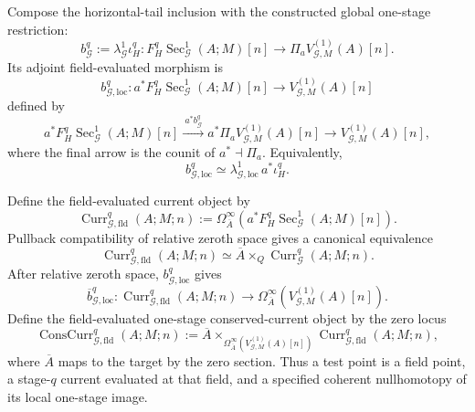 \begin{construction}
\label{constr:symmetry-noether-universal-one-stage-conserved-current-object}
Compose the horizontal-tail inclusion with the constructed global one-stage
restriction:
\[
b_{\mathcal G}^{q}
:=
\lambda_{\mathcal G}^{1}\iota_H^q:
F_H^q\operatorname{Sec}_{\mathcal G}^{1}(A;M)[n]
\longrightarrow
\Pi_aV_{\mathcal G,M}^{(1)}(A)[n].
\]
Its adjoint field-evaluated morphism is
\[
\boxed{
b_{\mathcal G,\mathrm{loc}}^{q}:
a^*F_H^q\operatorname{Sec}_{\mathcal G}^{1}(A;M)[n]
\longrightarrow
V_{\mathcal G,M}^{(1)}(A)[n]
}
\]
defined by
\[
a^*F_H^q\operatorname{Sec}_{\mathcal G}^{1}(A;M)[n]
\xrightarrow{\ a^*b_{\mathcal G}^{q}\ }
a^*\Pi_aV_{\mathcal G,M}^{(1)}(A)[n]
\longrightarrow
V_{\mathcal G,M}^{(1)}(A)[n],
\]
where the final arrow is the counit of $a^*\dashv\Pi_a$.  Equivalently,
\[
b_{\mathcal G,\mathrm{loc}}^{q}
\simeq
\lambda_{\mathcal G,\mathrm{loc}}^{1}\,a^*\iota_H^q.
\]

Define the field-evaluated current object by
\[
\boxed{
\operatorname{Curr}_{\mathcal G,\mathrm{fld}}^{q}(A;M;n)
:=
\Omega_{\overline A}^\infty
\left(
a^*F_H^q\operatorname{Sec}_{\mathcal G}^{1}(A;M)[n]
\right).
}
\]
Pullback compatibility of relative zeroth space gives a canonical equivalence
\[
\operatorname{Curr}_{\mathcal G,\mathrm{fld}}^{q}(A;M;n)
\simeq
\overline A\times_Q\operatorname{Curr}_{\mathcal G}^{q}(A;M;n).
\]
After relative zeroth space, $b_{\mathcal G,\mathrm{loc}}^{q}$ gives
\[
\overline b_{\mathcal G,\mathrm{loc}}^{q}:
\operatorname{Curr}_{\mathcal G,\mathrm{fld}}^{q}(A;M;n)
\longrightarrow
\Omega_{\overline A}^\infty
\left(V_{\mathcal G,M}^{(1)}(A)[n]\right).
\]
Define the field-evaluated one-stage conserved-current object by the zero locus
\[
\boxed{
\operatorname{ConsCurr}_{\mathcal G,\mathrm{fld}}^{q}(A;M;n)
:=
\overline A
\times_{\Omega_{\overline A}^\infty(V_{\mathcal G,M}^{(1)}(A)[n])}
\operatorname{Curr}_{\mathcal G,\mathrm{fld}}^{q}(A;M;n),
}
\]
where $\overline A$ maps to the target by the zero section.  Thus a test point is a
field point, a stage-$q$ current evaluated at that field, and a specified coherent
nullhomotopy of its local one-stage image.


\end{construction}
